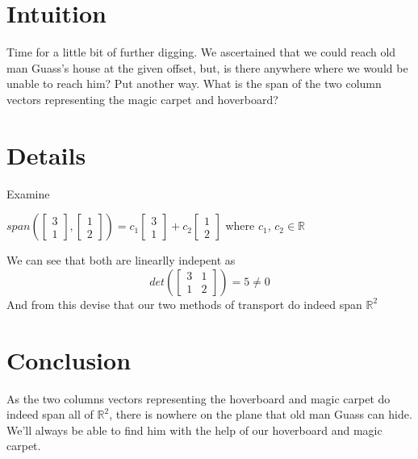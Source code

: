 \documentclass{article}
\begin{document}
\section{Intuition}
Time for a little bit of further digging. We ascertained that we could reach
old man Guass's house at the given offset, but, is there anywhere where we would
be unable to reach him? Put another way. What is the span of the two column vectors
representing the magic carpet and hoverboard?
\section{Details}
Examine
\begin{center}
$
span(\begin{bmatrix}3 \\ 1 \end{bmatrix},\begin{bmatrix}1 \\ 2 \end{bmatrix})
={c_1}\begin{bmatrix}3 \\ 1 \end{bmatrix} + {c_2}\begin{bmatrix}1 \\ 2 \end{bmatrix}
$
where $c_1$, $c_2 \in \mathbb{R}$
\end{center}

We can see that both are linearlly indepent as
\[det(\begin{bmatrix}3 & 1 \\ 1 & 2\end{bmatrix}) = 5 \ne 0\]
And from this devise that our two methods of transport do indeed span $\mathbb{R}^2$
\section{Conclusion}
As the two columns vectors representing the hoverboard and magic carpet do indeed
span all of $\mathbb{R}^2$, there is nowhere on the plane that old man Guass can hide.
We'll always be able to find him with the help of our hoverboard and magic carpet.
\end{document}

